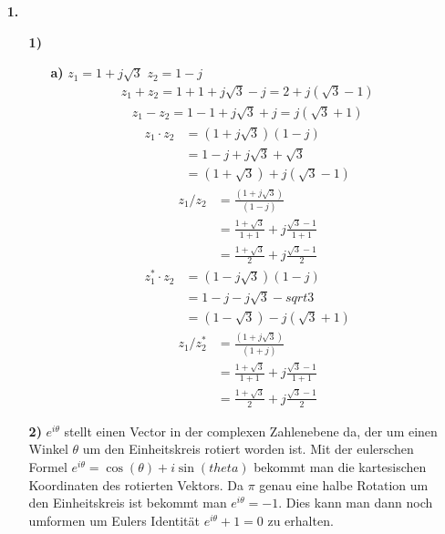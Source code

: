 \documentclass[a4paper,11pt]{article}
\author{\authorinfotitle}
\title{\titleinfo}
\date{\today}
\begin{document}
	\maketitle
	\begin{enumerate}
		\item[\textbf{1.}]
		\begin{enumerate}
		\item[\textbf{1)}]
		\begin{enumerate}
			\item[\textbf{a)}] $z_1 = 1+j\sqrt{3}$ $z_2=1-j$
			\begin{align*}
			z_1+z_2 = 1+1+j\sqrt{3}-j = 2+j(\sqrt{3}-1)
			\end{align*}
			\begin{align*}
			z_1-z_2 = 1-1+j\sqrt{3}+j = j(\sqrt{3}+1)
			\end{align*}
			\begin{align*}
			z_1 \cdot z_2 &= (1+j\sqrt{3})(1-j) \\
			              &= 1-j+j\sqrt{3}+\sqrt{3} \\
			              &= (1+\sqrt{3})+j(\sqrt{3}-1)
			\end{align*}
			\begin{align*}
			z_1 / z_2 &= \frac{(1+j\sqrt{3})}{(1-j)} \\
			          &= \frac{1+\sqrt{3}}{1+1}+j\frac{\sqrt{3}-1}{1+1} \\
			          &= \frac{1+\sqrt{3}}{2}+j\frac{\sqrt{3}-1}{2}
			\end{align*}
			\begin{align*}
			z_1^* \cdot z_2 &= (1-j\sqrt{3})(1-j) \\
			              &= 1-j-j\sqrt{3}-sqrt{3} \\
			              &= (1-\sqrt{3})-j(\sqrt{3}+1)
			\end{align*}
			\begin{align*}
			z_1 / z_2^* &= \frac{(1+j\sqrt{3})}{(1+j)} \\
			            &= \frac{1+\sqrt{3}}{1+1}+j\frac{\sqrt{3}-1}{1+1} \\
			            &= \frac{1+\sqrt{3}}{2}+j\frac{\sqrt{3}-1}{2}
			\end{align*}
		\end{enumerate}
		\item[\textbf{2)}]
		$e^{i\theta}$ stellt einen Vector in der complexen Zahlenebene da, der um einen Winkel $\theta$ um den Einheitskreis rotiert worden ist. Mit der eulerschen Formel $e^{i\theta} = \cos(\theta)+i\sin(theta)$ bekommt man die kartesischen Koordinaten des rotierten Vektors. Da $\pi$ genau eine halbe Rotation um den Einheitskreis ist bekommt man $e^{i\theta} = -1$. Dies kann man dann noch umformen um Eulers Identität $e^{i\theta} +1 = 0$ zu erhalten.
		

\end{enumerate}
\end{enumerate}
\end{document}
